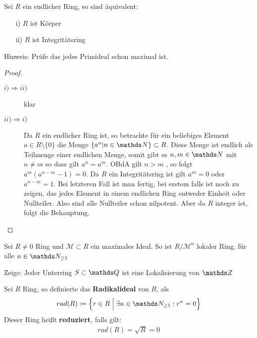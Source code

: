 \documentclass[ngerman, parskip=half, titlepage=false]{scrartcl}
\begin{document}
\begin{Satz}
  Sei $R$ ein endlicher Ring, so sind äquivalent:\\
  \begin{itemize}
  \item[i)] $R$ ist Körper
  \item[ii)] $R$ ist Integritätsring
  \end{itemize}
Hinweis: Prüfe das jedes Primideal schon maximal ist.
\begin{proof}
  \begin{description}
    \item[$i) \Rightarrow ii)$] klar
    \item[$ii) \Rightarrow i)$] Da $R$ ein endlicher Ring ist, so
      betrachte für ein beliebiges Element $a \in R \setminus \{ 0 \}$
      die Menge $\{ a^n | n \in \N \} \subset R$. Diese Menge ist
      endlich als Teilmenge einer endlichen Menge, somit gibt es
      $n,m \in \N$ mit $n \neq m$ so dass gilt $a^n = a^m$. OBdA gilt
      $n > m$ , so folgt $a^m (a^{n-m} - 1) = 0$. Da $R$ ein Integritätsring ist
      gilt $a^m = 0$ oder $a^{n-m} = 1$. Bei letzteren Fall ist man fertig, bei 
      erstem falls ist noch zu zeigen, das jedes Element in einem endlichen Ring
      entweder Einheit oder Nullteiler. Also sind alle Nullteiler schon
      nilpotent. Aber da $R$ integer ist, folgt die Behauptung.
  \end{description}
\end{proof}
\end{Satz}

\begin{Satz}
  Sei $R \neq 0$ Ring und $\mathcal{M} \subset R$ ein maximales Ideal.
  So ist $R/\mathcal{M}^n$ lokaler Ring, für alle $n \in \N_{\geq 1}$
\end{Satz}

\begin{Satz}
  Zeige: Jeder Unterring $S \subset \Q$ ist eine Lokalisierung von $\Z$
\end{Satz}

\begin{Def}
  Sei $R$ Ring, so definierte das \textbf{Radikalideal} von $R$, als
  \begin{gather*}
    rad(R) \coloneqq \left\{ r \in R \; \Big| \; \exists n \in
      \N_{\geq 1} : r^n = 0 \right\}
  \end{gather*}
  Dieser Ring heißt \textbf{reduziert}, falls gilt:
  \begin{gather*}
    rad(R)=\sqrt{R} =0
  \end{gather*}
\end{Def}
\end{document}
